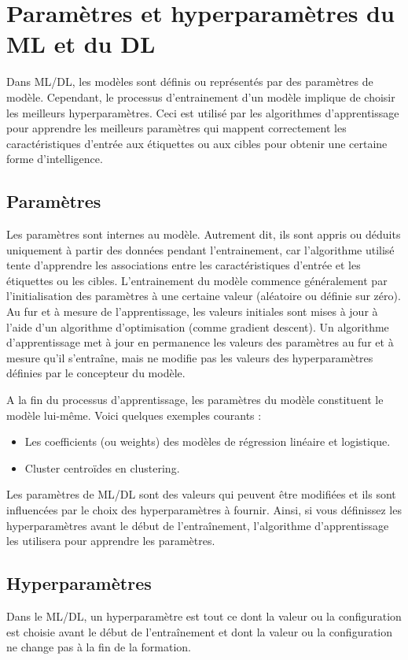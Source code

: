 \section{Paramètres et hyperparamètres du ML et du DL}
Dans ML/DL, les modèles sont définis ou représentés par des paramètres de modèle. Cependant, le processus d’entrainement d'un modèle implique de choisir les meilleurs hyperparamètres. Ceci est utilisé par les algorithmes d'apprentissage pour apprendre les meilleurs paramètres qui mappent correctement les caractéristiques d'entrée aux étiquettes ou aux cibles pour obtenir une certaine forme d'intelligence.
\subsection{Paramètres}
Les paramètres sont internes au modèle. Autrement dit, ils sont appris ou déduits uniquement à partir des données pendant l’entrainement, car l'algorithme utilisé tente d'apprendre les associations entre les caractéristiques d'entrée et les étiquettes ou les cibles. L’entrainement du modèle commence généralement par l'initialisation des paramètres à une certaine valeur (aléatoire ou définie sur zéro). \\Au fur et à mesure de l'apprentissage, les valeurs initiales sont mises à jour à l'aide d'un algorithme d'optimisation (comme gradient descent). Un algorithme d'apprentissage met à jour en permanence les valeurs des paramètres au fur et à mesure qu'il s'entraîne, mais ne modifie pas les valeurs des hyperparamètres définies par le concepteur du modèle. 

A la fin du processus d'apprentissage, les paramètres du modèle constituent le modèle lui-même.
Voici quelques exemples courants :
\begin{itemize}
    \item Les coefficients (ou weights) des modèles de régression linéaire et logistique.
    \item Cluster centroïdes en clustering.
\end{itemize}

Les paramètres de ML/DL sont des valeurs qui peuvent être modifiées et ils sont influencées par le choix des hyperparamètres à fournir. Ainsi, si vous définissez les hyperparamètres avant le début de l'entraînement, l'algorithme d'apprentissage les utilisera pour apprendre les paramètres. 

\subsection{Hyperparamètres}
Dans le ML/DL, un hyperparamètre est tout ce dont la valeur ou la configuration est choisie avant le début de l’entraînement et dont la valeur ou la configuration ne change pas à la fin de la formation. 

